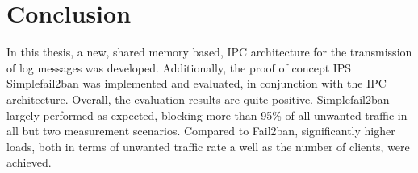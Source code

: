 %
%
\chapter{Conclusion}

In this thesis, a new, shared memory based, \ac{IPC} architecture for the transmission of log messages was developed.
Additionally, the proof of concept \ac{IPS} Simplefail2ban was implemented and evaluated, in conjunction with the \ac{IPC} architecture.
Overall, the evaluation results are quite positive. Simplefail2ban largely performed as expected, blocking more than 95\% of all unwanted
traffic in all but two measurement scenarios. Compared to Fail2ban, significantly higher loads, both in terms of unwanted traffic 
rate a well as the number of clients, were achieved.  